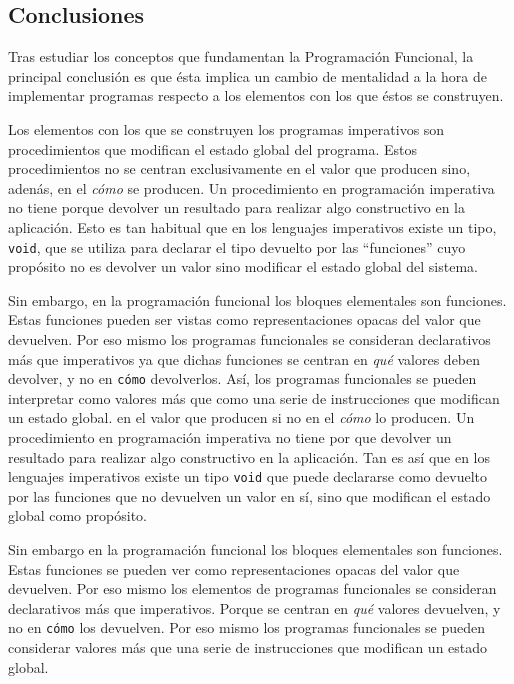 \documentclass[../main.tex]{subfiles}
\begin{document}
\subsection{Conclusiones}
Tras estudiar los conceptos que fundamentan la Programación Funcional, la principal
conclusión es que ésta implica un cambio de mentalidad a la hora de implementar programas
respecto a los elementos con los que éstos se construyen.

Los elementos con los que se construyen los programas imperativos son procedimientos
que modifican el estado global del programa. Estos procedimientos no se centran exclusivamente
en el valor que producen sino, adenás, en el \textit{cómo} se producen. Un procedimiento en programación
imperativa no tiene porque devolver un resultado para realizar algo constructivo en la aplicación.
Esto es tan habitual que en los lenguajes imperativos existe un tipo, \texttt{void}, que se utiliza
para declarar el tipo devuelto por las ``funciones'' cuyo propósito no es devolver un valor sino  
modificar el estado global del sistema.

Sin embargo, en la programación funcional los bloques elementales son funciones. Estas
funciones pueden ser vistas como representaciones opacas del valor que devuelven. Por eso
mismo los programas funcionales se consideran declarativos más que imperativos ya que
dichas funciones se centran en \textit{qué} valores deben devolver, y no en \texttt{cómo} 
devolverlos. Así, los programas funcionales se pueden interpretar como valores más que como 
una serie de instrucciones que modifican un estado global.
en el valor que producen si no en el \textit{cómo} lo producen. Un procedimiento en programación
imperativa no tiene por que devolver un resultado para realizar algo constructivo en la aplicación.
Tan es así que en los lenguajes imperativos existe un tipo \texttt{void} que puede declararse
como devuelto por las funciones que no devuelven un valor en sí, sino que modifican el estado global
como propósito.

Sin embargo en la programación funcional los bloques elementales son funciones. Estas
funciones se pueden ver como representaciones opacas del valor que devuelven. Por eso
mismo los elementos de programas funcionales se consideran declarativos más que imperativos.
Porque se centran en \textit{qué} valores devuelven, y no en \texttt{cómo} los devuelven.
Por eso mismo los programas funcionales se pueden considerar valores más que una serie de
instrucciones que modifican un estado global.
\end{document}
